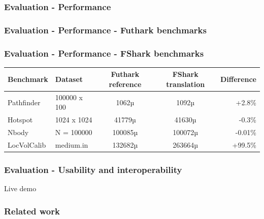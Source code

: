 \documentclass[10pt, compress, usenames, dvipsnames]{beamer}
\begin{document}
\begin{frame}[fragile]
  \frametitle{Evaluation - Performance}




\end{frame}
\begin{frame}[fragile]
  \frametitle{Evaluation - Performance - Futhark benchmarks}
  
\end{frame}

\begin{frame}[fragile,c]
  \frametitle{Evaluation - Performance - FShark benchmarks}
  \begin{center}
  {\scriptsize
  \begin{tabular}{| l | l | c | c | r |}
    \hline			
    \textbf{Benchmark} & \textbf{Dataset} & \textbf{Futhark reference} & \textbf{FShark translation} & \textbf{Difference} \\
    \hline  
    Pathfinder & 100000 x 100 & 1062µ & 1092µ & +2.8\% \\
    \hline  
    Hotspot & 1024 x 1024 & 41779µ & 41630µ & -0.3\% \\
    \hline  
    Nbody & N = 100000 & 100085µ & 100072µ & -0.01\% \\
    \hline  
    LocVolCalib & medium.in & 132682µ & 263664µ & +99.5\% \\
    \hline  
  \end{tabular}
  }
    \end{center}
\end{frame}

\begin{frame}[fragile]
  \frametitle{Evaluation - Usability and interoperability}
  \begin{center}
    \Huge Live demo
  \end{center}
  
\end{frame}

\begin{frame}[fragile]
  \frametitle{Related work}
\end{frame}

\end{document}
